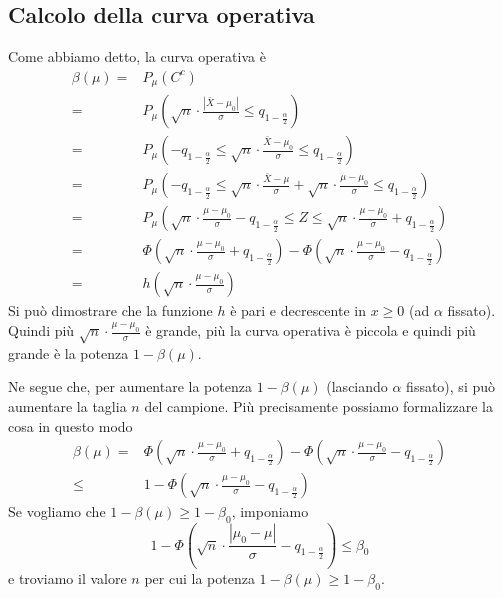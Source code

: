 \subsection{Calcolo della curva operativa}
Come abbiamo detto, la curva operativa è
\begin{align*}
	\beta (\mu) = & P_\mu (C^c)                                                         \\
	=             & P_\mu \left( \sqrt{n} \cdot \frac{|\bar{X} - \mu_0|}{\sigma}
	\leq q_{1 - \frac{\alpha}{2}} \right)                                               \\
	=             & P_\mu \left( -q_{1-\frac{\alpha}{2}} \leq
	\sqrt{n} \cdot \frac{\bar{X} - \mu_0}{\sigma} \leq q_{1 - \frac{\alpha}{2}} \right) \\
	=             & P_\mu \left( -q_{1-\frac{\alpha}{2}} \leq
	\sqrt{n} \cdot \frac{\bar{X} - \mu}{\sigma} + \sqrt{n} \cdot \frac{\mu - \mu_0}{\sigma}
	\leq q_{1-\frac{\alpha}{2}} \right)                                                 \\
	=             & P_\mu \left( \sqrt{n} \cdot \frac{\mu - \mu_0}{\sigma} -
	q_{1 - \frac{\alpha}{2}} \leq Z \leq
	\sqrt{n} \cdot \frac{\mu - \mu_0}{\sigma} + q_{1-\frac{\alpha}{2}} \right)          \\
	=             & \Phi \left( \sqrt{n} \cdot \frac{\mu - \mu_0}{\sigma} +
	q_{1-\frac{\alpha}{2}} \right) - \Phi \left( \sqrt{n} \cdot
	\frac{\mu - \mu_0}{\sigma} - q_{1-\frac{\alpha}{2}} \right)                         \\
	=             & h \left( \sqrt{n} \cdot \frac{\mu - \mu_0}{\sigma} \right)
\end{align*}
Si può dimostrare che la funzione $h$ è pari e decrescente in $x \geq 0$ (ad $\alpha$ fissato).
Quindi più $\sqrt{n} \cdot \frac{\mu - \mu_0}{\sigma}$ è grande, più la curva operativa è piccola
e quindi più grande è la potenza $1 - \beta(\mu)$.

Ne segue che, per aumentare la potenza $1 - \beta(\mu)$ (lasciando $\alpha$ fissato), si può
aumentare la taglia $n$ del campione. Più precisamente possiamo formalizzare la cosa in questo modo
\begin{align*}
	\beta (\mu) = & \Phi \left( \sqrt{n} \cdot \frac{\mu - \mu_0}{\sigma} +
	q_{1-\frac{\alpha}{2}} \right) - \Phi \left( \sqrt{n} \cdot
	\frac{\mu - \mu_0}{\sigma} - q_{1-\frac{\alpha}{2}} \right)                 \\
	\leq          & 1 - \Phi \left( \sqrt{n} \cdot \frac{\mu - \mu_0}{\sigma} -
	q_{1-\frac{\alpha}{2}} \right)
\end{align*}
Se vogliamo che $1-\beta(\mu) \geq 1 - \beta_0$, imponiamo
\[
	1 - \Phi \left( \sqrt{n} \cdot \frac{|\mu_0 - \mu|}{\sigma} -
	q_{1-\frac{\alpha}{2}} \right) \leq \beta_0
\]
e troviamo il valore $n$ per cui la potenza $1 - \beta(\mu) \geq 1 - \beta_0$.


